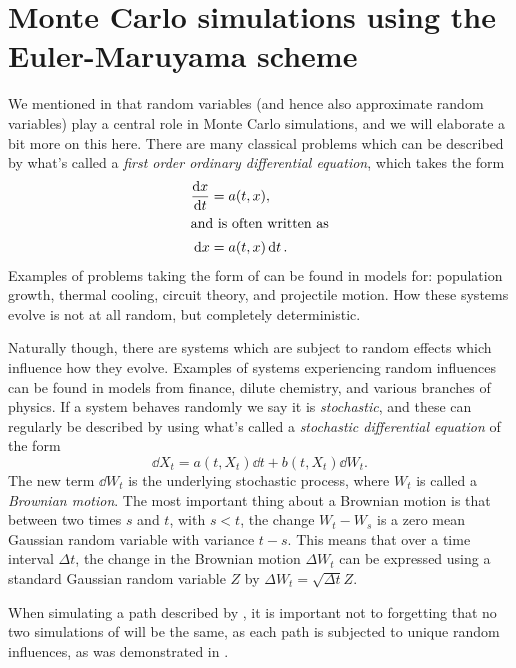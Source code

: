 \documentclass[11pt,a4paper,twoside,english]{extarticle}
\begin{document}
\clearpage
\section{Monte Carlo simulations using the Euler-Maruyama scheme}

We mentioned in  that random variables (and hence also approximate random variables) play a central role in Monte Carlo simulations, and we will elaborate a bit more on this here. There are many classical problems which can be described by what's called a \emph{first order ordinary differential equation}, which takes the form 
\begin{align}
\dv{x}{t} & = a(t, x), \\
\shortintertext{and is often written as}
\dd{x} & = a(t, x) \dd{t}. \label{eqt:first_order_ode}
\end{align}
Examples of problems taking the form of  can be found in models for: population growth, thermal cooling, circuit theory, and projectile motion. How these systems evolve is not at all random, but completely deterministic. 

Naturally though, there are systems which are subject to random effects which influence how they evolve. Examples of systems experiencing random influences can be found in models from finance, dilute chemistry, and various branches of physics. If a system behaves randomly we say it is \emph{stochastic}, and these can regularly be described by using what's called a \emph{stochastic differential equation} of the form
\begin{equation}
\dd{X_t}  = a(t, X_t) \dd{t} + b(t, X_t) \dd{W_t}. \label{eqt:sde}
\end{equation}
The new term $ \dd{W_t} $ is the underlying stochastic process, where $ W_t $ is called a \emph{Brownian motion}. The most important thing about a Brownian motion is that between two times $ s $ and $ t $, with $ s < t $, the change $ W_t - W_s $ is a zero mean Gaussian random variable with variance $ t - s $. This means that over a time interval $ \Delta t $, the change in the  Brownian motion $ \Delta W_t $ can be expressed using a standard Gaussian random variable $ Z $ by $ \Delta W_t = \sqrt{\Delta t} Z $.

When simulating a path described by , it is important not to forgetting that no two simulations of  will be the same, as each path is subjected to unique random influences, as was demonstrated in . 
\end{document}
